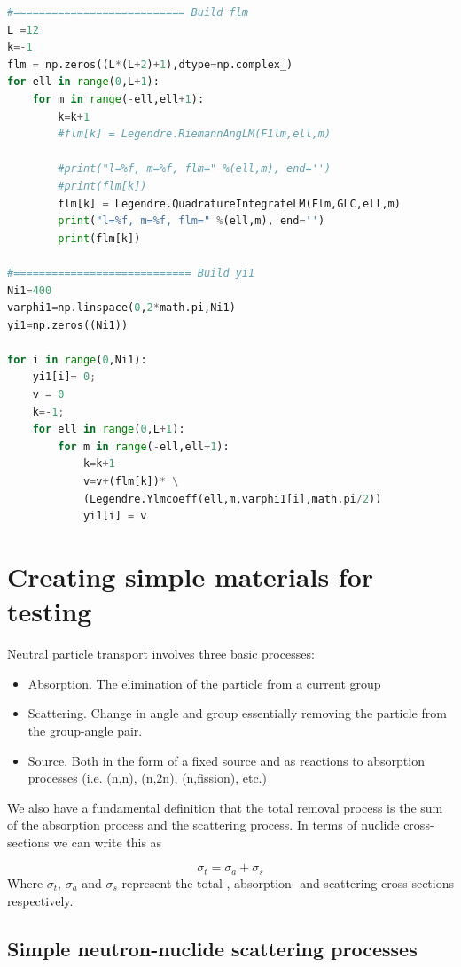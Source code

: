 \documentclass[11pt,letterpaper,titlepage]{article}
\renewcommand{\thefigure}{\arabic{section}.\arabic{figure}}
\numberwithin{equation}{section}
\begin{document}
\begin{appendices}
\begin{lstlisting}[language=python]
#=========================== Build flm
L =12
k=-1
flm = np.zeros((L*(L+2)+1),dtype=np.complex_)
for ell in range(0,L+1):
    for m in range(-ell,ell+1):
        k=k+1
        #flm[k] = Legendre.RiemannAngLM(F1lm,ell,m)
        
        #print("l=%f, m=%f, flm=" %(ell,m), end='')
        #print(flm[k])
        flm[k] = Legendre.QuadratureIntegrateLM(Flm,GLC,ell,m)
        print("l=%f, m=%f, flm=" %(ell,m), end='')
        print(flm[k])

#============================ Build yi1
Ni1=400
varphi1=np.linspace(0,2*math.pi,Ni1)
yi1=np.zeros((Ni1))

for i in range(0,Ni1):
    yi1[i]= 0;
    v = 0
    k=-1;
    for ell in range(0,L+1):
        for m in range(-ell,ell+1):
            k=k+1
            v=v+(flm[k])* \
            (Legendre.Ylmcoeff(ell,m,varphi1[i],math.pi/2))
            yi1[i] = v
\end{lstlisting}



\newpage 
\renewcommand{\thefigure}{C.\arabic{figure}}
\section{Creating simple materials for testing}
Neutral particle transport involves three basic processes:
\begin{itemize}
\item Absorption. The elimination of the particle from a current group
\item Scattering. Change in angle and group essentially removing the particle from the group-angle pair.
\item Source. Both in the form of a fixed source and as reactions to absorption processes (i.e. (n,n), (n,2n), (n,fission), etc.)
\end{itemize}

We also have a fundamental definition that the total removal process is the sum of the absorption process and the scattering process. In terms of nuclide cross-sections we can write this as

$$
\sigma_t = \sigma_a + \sigma_s 
$$
Where $\sigma_t$, $\sigma_a$ and $\sigma_s$ represent the total-, absorption- and scattering cross-sections respectively.

\subsection{Simple neutron-nuclide scattering processes}


\end{appendices}
\end{document}
